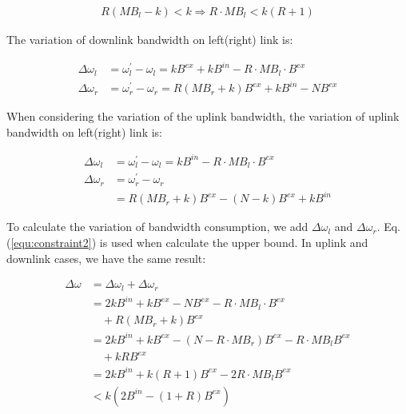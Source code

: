 \documentclass[10pt, conference, letterpaper]{IEEEtran}
\begin{document}
\begin{equation}
\begin{aligned}\label{equ:constraint2}
R(MB_l-k) < k \Longrightarrow R\cdot MB_l < k(R+1)
\end{aligned}
\end{equation}

The variation of downlink bandwidth on left(right) link is:

\begin{equation}
\begin{aligned}
\Delta \omega_l &= \omega_l^{'} - \omega_l=kB^{ex}+kB^{in} - R\cdot MB_l \cdot B^{ex} \\
\Delta \omega_r &= \omega_r^{'} - \omega_r=R(MB_r+k)B^{ex}+kB^{in} - NB^{ex} 
\end{aligned}
\end{equation}

When considering the variation of the uplink bandwidth, the variation of uplink bandwidth on left(right) link is:

\begin{equation}
\begin{aligned}
\Delta \omega_l &= \omega_l^{'} - \omega_l= kB^{in}-R\cdot MB_l\cdot B^{ex} \\
\Delta \omega_r &= \omega_r^{'} - \omega_r\\
&= R(MB_r+k)B^{ex}-(N-k)B^{ex}+kB^{in}
\end{aligned}
\end{equation}

To calculate the variation of bandwidth consumption, we add $\Delta \omega_l$ and $\Delta \omega_r$. Eq. (\ref{equ:constraint2}) is used when calculate the upper bound. In uplink and downlink cases, we have the same result:

\begin{equation}
\begin{aligned}
\Delta \omega &=\Delta \omega_l +\Delta \omega_r \\
&= 2kB^{in}+kB^{ex}-NB^{ex}-R\cdot MB_l\cdot B^{ex}\\
&\quad+R(MB_r+k)B^{ex} \\
&= 2kB^{in}+kB^{ex}-(N-R\cdot MB_r)B^{ex}-R\cdot MB_lB^{ex}\\
&\quad+kRB^{ex} \\
&= 2kB^{in}+k(R+1)B^{ex}-2R\cdot MB_lB^{ex} \\
&< k(2B^{in}-(1+R)B^{ex})
\end{aligned}
\end{equation}
\end{document}
